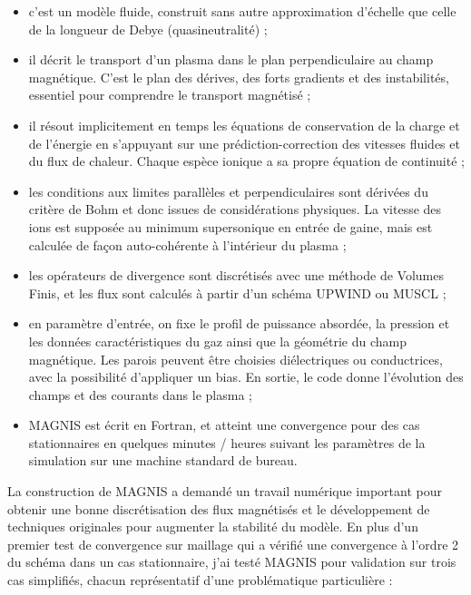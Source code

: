\begin{itemize}
  \item c'est un modèle fluide, construit sans autre approximation
  d'échelle que celle de la longueur de Debye (quasineutralité) ;
  \item il décrit le transport d'un plasma dans le
  plan perpendiculaire au champ magnétique. C'est le plan des dérives, des forts
  gradients et des instabilités, essentiel pour comprendre le transport
  magnétisé ;
  \item il résout implicitement en temps les équations de conservation de la
  charge et de l'énergie en s'appuyant sur une prédiction-correction des
  vitesses fluides et du flux de chaleur. Chaque espèce ionique a sa propre
  équation de continuité ;
  \item  les conditions aux limites parallèles et perpendiculaires sont 
 dérivées du critère de Bohm et donc issues de considérations physiques. La
 vitesse des ions est supposée au minimum supersonique en entrée de gaine, mais
 est calculée de façon auto-cohérente à l'intérieur du plasma ;
 \item les opérateurs de divergence sont discrétisés avec une méthode de Volumes
 Finis, et les flux sont calculés à partir d'un schéma UPWIND ou MUSCL ;
 \item en paramètre d'entrée, on fixe le profil de puissance absordée, la
 pression et les données caractéristiques du gaz ainsi que la géométrie du champ
 magnétique.
 Les parois peuvent être choisies diélectriques ou conductrices, avec la possibilité d'appliquer un bias. En
sortie, le code donne l'évolution des champs et des courants dans le plasma ;
 \item MAGNIS est écrit en Fortran,
 et atteint une convergence pour des cas stationnaires en quelques minutes / heures suivant les paramètres de la simulation sur une machine standard de bureau.
\end{itemize} 

La construction de MAGNIS a demandé un travail numérique
important pour obtenir une bonne discrétisation des flux
magnétisés et le développement de techniques originales pour augmenter la
stabilité du modèle.
En plus d'un premier test de convergence sur maillage qui a vérifié une
convergence à l'ordre 2 du schéma dans un cas stationnaire, j'ai testé MAGNIS
pour validation sur trois cas simplifiés, chacun représentatif d'une
problématique particulière :

